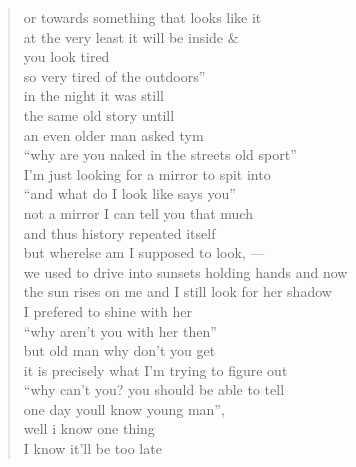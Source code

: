 \documentclass[11pt]{article}
\begin{document}
\begin{verse}
or towards something that looks like it\\
at the very least it will be inside \&\\
you look tired\\
so very tired of the outdoors''\\
\vspace*{1em}
in the night it was still\\
the same old story untill\\
an even older man asked tym\\
``why are you naked in the streets old sport''\\
I'm just looking for a mirror to spit into\\
``and what do I look like says you''\\
not a mirror I can tell you that much\\
and thus history repeated itself\\
\vspace*{1em}
but wherelse am I supposed to look, ---\\
we used to drive into sunsets holding hands and now\\
the sun rises on me and I still look for her shadow\\
I prefered to shine with her\\
``why aren't you with her then''\\
but old man why don't you get\\
it is precisely what I'm trying to figure out\\
``why can't you? you should be able to tell\\
one day youll know young man'',\\
well i know one thing\\
I know it'll be too late\\
\end{verse}
\end{document}
